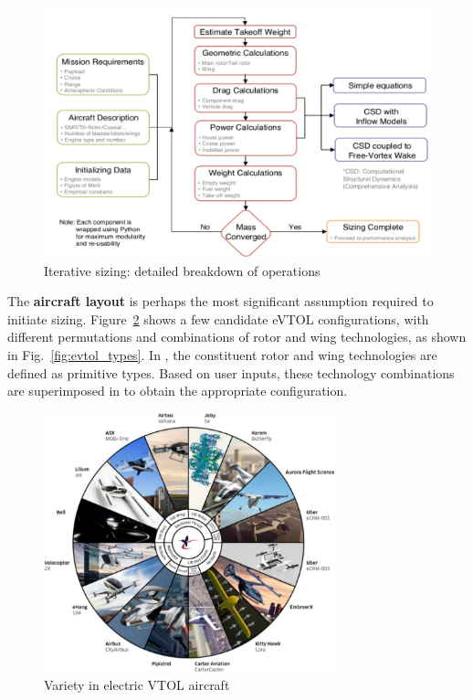 \begin{figure}
\begin{center}
\includegraphics[width=\textwidth]{images/sizingloop.png}
\caption{Iterative sizing: detailed breakdown of operations}
\label{fig:itsize2}
\end{center}
\end{figure}

The \textbf{aircraft layout} is perhaps the most significant assumption required to initiate sizing. Figure~\ref{fig:evtols} shows a few candidate eVTOL configurations, with different permutations and combinations of rotor and wing technologies, as shown in Fig.~\ref{fig:evtol_types}. In \hydra, the constituent rotor and wing technologies are defined as primitive types. Based on user inputs, these technology combinations are superimposed in \hydra \spc to obtain the appropriate configuration. 

\begin{figure}
\begin{center}
\includegraphics[width=0.75\textwidth]{images/evtols.png}
\caption{Variety in electric VTOL aircraft}
\label{fig:evtols}
\end{center}
\end{figure}

